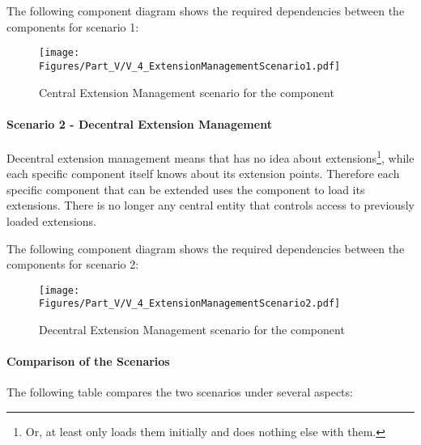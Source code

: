 The following component diagram shows the required dependencies between the \LibName{} components for scenario 1:

\begin{figure}[H]
	\centering
	\texttt{[image: Figures/Part\_V/V\_4\_ExtensionManagementScenario1.pdf]}
	\caption{Central Extension Management scenario for the \COMPextensionManagement{} component}
	\label{fig:V_4_ExtensionManagementScenario1}
\end{figure}


\paragraph{Scenario 2 - Decentral Extension Management}
\label{sec:Scenario2DecentralExtensionManagement}

Decentral extension management means that \COMPcontext{} has no idea about extensions\footnote{Or, at least only loads them initially and does nothing else with them.}, while each specific component itself knows about its extension points. Therefore each specific component that can be extended uses the \COMPextensionManagement{} component to load its extensions. There is no longer any central entity that controls access to previously loaded extensions.

The following component diagram shows the required dependencies between the \LibName{} components for scenario 2:

\begin{figure}[H]
	\centering
	\texttt{[image: Figures/Part\_V/V\_4\_ExtensionManagementScenario2.pdf]}
	\caption{Decentral Extension Management scenario for the \COMPextensionManagement{} component}
	\label{fig:V_4_ExtensionManagementScenario2}
\end{figure}


\paragraph{Comparison of the Scenarios}
\label{sec:ComparisonoftheScenarios}

The following table compares the two scenarios under several aspects:

